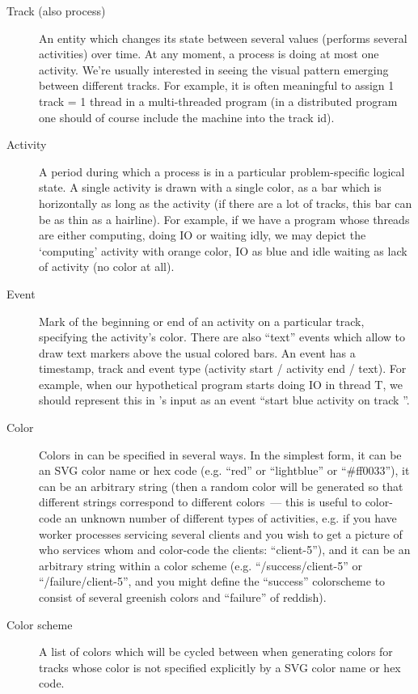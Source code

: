 \documentclass{article}
\begin{document}
\begin{description}
\item[Track (also process)] An entity which changes its state between several values (performs several activities) over time. At any moment, a process is doing at most one activity. We're usually interested in seeing the visual pattern emerging between different tracks. For example, it is often meaningful to assign 1 track = 1 thread in a multi-threaded program (in a distributed program one should of course include the machine into the track id).
\item[Activity] A period during which a process is in a particular problem-specific logical state. A single activity is drawn with a single color, as a bar which is horizontally as long as the activity (if there are a lot of tracks, this bar can be as thin as a hairline). For example, if we have a program whose threads are either computing, doing IO or waiting idly, we may depict the `computing' activity with orange color, IO as blue and idle waiting as lack of activity (no color at all).
\item[Event] Mark of the beginning or end of an activity on a particular track, specifying the activity's color. There are also ``text'' events which allow to draw text markers above the usual colored bars. An event has a timestamp, track and event type (activity start / activity end / text). For example, when our hypothetical program starts doing IO in thread T, we should represent this in \splot{}'s input as an event ``start blue activity on track ''.
\item[Color] Colors in \splot{} can be specified in several ways. In the simplest form, it can be an SVG color name or hex code (e.g. ``red'' or ``lightblue'' or ``\#ff0033''), it can be an arbitrary string (then a random color will be generated so that different strings correspond to different colors~--- this is useful to color-code an unknown number of different types of activities, e.g. if you have worker processes servicing several clients and you wish to get a picture of who services whom and color-code the clients: ``client-5''), and it can be an arbitrary string within a color scheme (e.g. ``/success/client-5'' or ``/failure/client-5'', and you might define the ``success'' colorscheme to consist of several greenish colors and ``failure'' of reddish).
\item[Color scheme] A list of colors which will be cycled between when generating colors for tracks whose color is not specified explicitly by a SVG color name or hex code.
\end{description}
\end{document}
